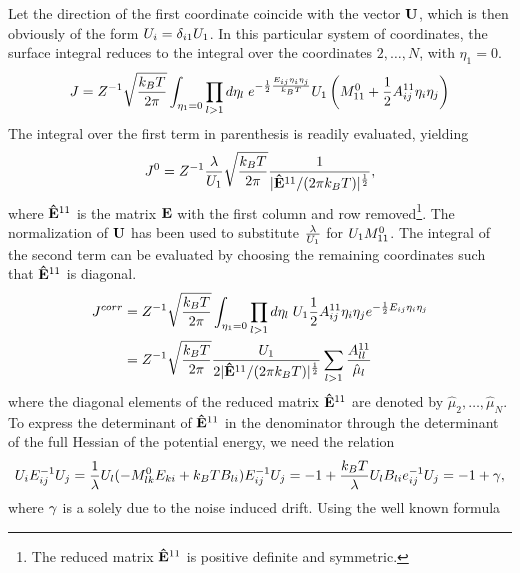 Let the direction of the first coordinate coincide with the vector $\mathbf{U}$, which is then obviously of the form $U_i=\delta_{i1} U_1$.
In this particular system of coordinates, the surface integral reduces to the integral
over the coordinates $2, \ldots, N$, with $\eta_1=0$. 
\begin{equation}
\label{eq:totalflux}
J=Z^{-1}\sqrt{\frac{k_BT}{2\pi}}\int_{\eta_1=0} \prod_{l>1} d\eta_l\; e^{-\frac{1}{2}\frac{E_{ij}\eta_i\eta_j}{k_BT}} U_1\left( M^{0}_{11}+\frac{1}{2}A^{11}_{ij}\eta_i\eta_j\right) 
\end{equation}
The integral over the first term in parenthesis is readily evaluated, yielding
\begin{equation}
\begin{split}
J^{0}=Z^{-1}\frac{\lambda}{U_{1}}\sqrt{\frac{k_BT}{2\pi}}\frac{1}{|\mathbf{\hat{E}}^{11}/(2\pi k_BT)|^{\frac{1}{2}}},
\end{split}
\end{equation}
where $\mathbf{\hat{E}}^{11}$ is the matrix $\mathbf{E}$ with the first column and row removed\footnote{The reduced matrix 
$\mathbf{\hat{E}}^{11}$ is positive definite and symmetric.}. The
normalization of $\mathbf{U}$ has been used to substitute $\frac{\lambda}{U_1}$ for $U_1M^{0}_{11}$.
The integral of the second term can be evaluated by choosing the remaining coordinates such that 
$\mathbf{\hat{E}}^{11}$ is diagonal. 
\begin{equation}
\begin{split}
J^{corr}&=Z^{-1}\sqrt{\frac{k_BT}{2\pi}}\int_{\eta_1=0} \prod_{l>1} d\eta_l \;U_1\frac{1}{2}A^{11}_{ij}\eta_i\eta_j e^{-\frac{1}{2}E_{ij}\eta_i\eta_j}\\
&=Z^{-1}\sqrt{\frac{k_BT}{2\pi}} \frac{U_1}{2|\mathbf{\hat{E}}^{11}/(2\pi k_BT)|^{\frac{1}{2}}}\sum_{l>1} \frac{A^{11}_{ll}}{\hat{\mu}_l}\end{split}
\end{equation}
where the diagonal elements of the reduced matrix $\mathbf{\hat{E}}^{11}$ are denoted by $\hat{\mu}_2, \ldots, \hat{\mu}_N$.
To express the determinant of $\mathbf{\hat{E}}^{11}$ in the denominator through the determinant of the full 
Hessian of the potential energy, we need the relation
\begin{equation}
U_i E^{-1}_{ij}U_j=\frac{1}{\lambda}U_l (-M^{0}_{lk}E_{ki}+k_BT B_{li})E^{-1}_{ij}U_j=-1 + \frac{k_BT}{\lambda}U_l B_{li}e^{-1}_{ij}U_j=-1+\gamma,
\end{equation}
where $\gamma$ is a solely due to the noise induced drift.  Using the well known formula 
